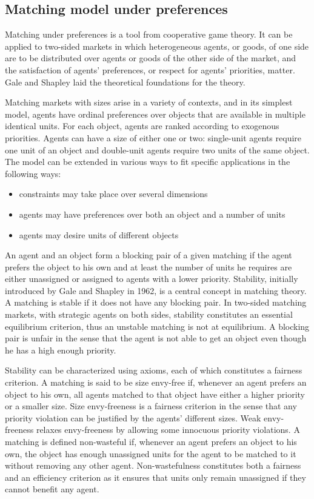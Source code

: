 \subsection{Matching model under preferences}\label{matching-model-under-preferences}%

Matching under preferences is a tool from cooperative game theory. It can be applied to two-sided markets in which heterogeneous agents, or goods, of one side are to be distributed over agents or goods of the other side of the market, and the satisfaction of agents’ preferences, or respect for agents’ priorities, matter. Gale and Shapley laid the theoretical foundations for the theory.


Matching markets with sizes arise in a variety of contexts, and in its simplest model, agents have ordinal preferences over objects that are available in multiple identical units. For each object, agents are ranked according to exogenous priorities. Agents can have a size of either one or two: single-unit agents require one unit of an object and double-unit agents require two units of the same object. The model can be extended in various ways to fit specific applications in the following ways:
\begin{itemize}
\item constraints may take place over several dimensions
\item agents may have preferences over both an object and a number of
units
\item agents may desire units of different objects
\end{itemize}
 An agent and an object form a blocking pair of a given matching if the agent prefers the object to his own and at least the number of units he requires are either unassigned or assigned to agents with a lower priority. Stability, initially introduced by Gale and Shapley in 1962, is a central concept in matching theory. A matching is stable if it does not have any blocking pair. In two-sided matching markets, with strategic agents on both sides, stability constitutes an essential equilibrium criterion, thus an unstable matching is not at equilibrium. A blocking pair is unfair in the sense that the agent is not able to get an object even though he has a high enough priority. 
 
 
Stability can be characterized using axioms, each of which constitutes a fairness criterion. A matching is said to be size envy-free if, whenever an agent prefers an object to his own, all agents matched to that object have either a higher priority or a smaller size. Size envy-freeness is a fairness criterion in the sense that any priority violation can be justified by the agents' different sizes. Weak envy-freeness relaxes envy-freeness by allowing some innocuous priority violations. A matching is defined non-wasteful if, whenever an agent prefers an object to his own, the object has enough unassigned units for the agent to be matched to it without removing any other agent. Non-wastefulness constitutes both a fairness and an efficiency criterion as it ensures that units only remain unassigned if they cannot benefit any agent.

